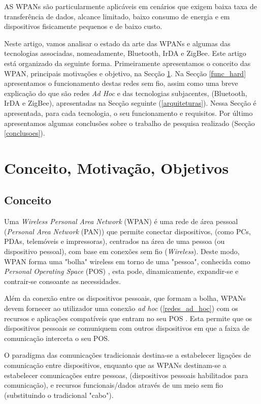 \documentclass[conference]{IEEEtran}
\begin{document}
AS WPANs são particularmente aplicáveis em cenários que exigem baixa taxa de transferência de dados, alcance limitado, baixo consumo de energia e em dispositivos fisicamente pequenos e de baixo custo.

Neste artigo, vamos analisar o estado da arte das WPANs e algumas das tecnologias associadas, nomeadamente, Bluetooth, IrDA e ZigBee.
Este artigo está organizado da seguinte forma.
Primeiramente apresentamos o conceito das WPAN, principais motivações e objetivo, na Secção \ref{conc_mot_obj}.
Na Secção \ref{func_hard} apresentamos o funcionamento destas redes sem fio, assim como uma breve explicação do que são redes \textit{Ad Hoc} e das tecnologias subjacentes, (Bluetooth, IrDA e ZigBee), apresentadas na Secção seguinte (\ref{arquiteturas}).
Nessa Secção é apresentada, para cada tecnologia, o seu funcionamento e requisitos.
Por último apresentamos algumas conclusões sobre o trabalho de pesquisa realizado (Secção \ref{conclusoes}).


\section{Conceito, Motivação, Objetivos} \label{conc_mot_obj}

\subsection{Conceito}

Uma \textit{Wireless Personal Area Network} (WPAN) é uma rede de área pessoal (\textit{Personal Area Network} (PAN)) que permite conectar dispositivos, (como PCs, PDAs, telemóveis e impressoras), centrados na área de uma pessoa (ou dispositivo pessoal), com base em conexões sem fio (\textit{Wireless}). 
Deste modo, WPAN forma uma "bolha" wireless em torno de uma "pessoa", conhecida como \textit{Personal Operating Space} (POS) \cite{prasad2004ofdm}, esta pode, dinamicamente, expandir-se e contrair-se consoante as necessidades.

Além da conexão entre os dispositivos pessoais, que formam a bolha, WPANs devem fornecer ao utilizador uma conexão \textit{ad hoc} (\ref{redes_ad_hoc}) com os recursos e aplicações compatíveis que entram no seu POS \cite{prasad2004ofdm}.
Esta permite que os dispositivos pessoais se comuniquem com outros dispositivos em que a faixa de comunicação interceta o seu POS.

O paradigma das comunicações tradicionais destina-se a estabelecer ligações de comunicação entre dispositivos, enquanto que as WPANs destinam-se a estabelecer comunicações entre pessoas, (dispositivos pessoais habilitados para comunicação), e recursos funcionais/dados através de um meio sem fio (substituindo o tradicional "cabo").
\end{document}
